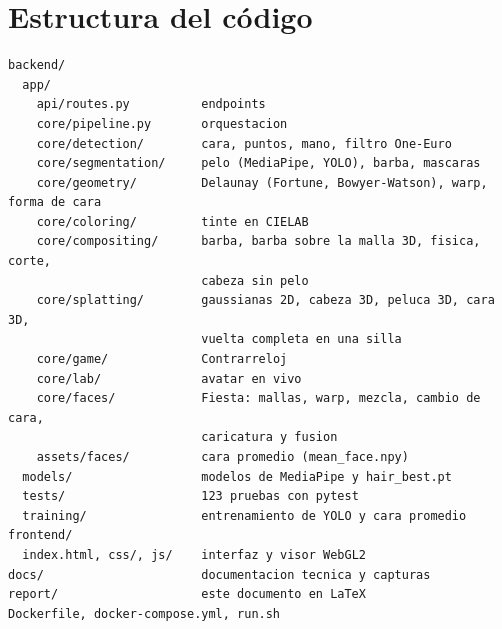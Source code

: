 \section{Estructura del código}

\begin{lstlisting}
backend/
  app/
    api/routes.py          endpoints
    core/pipeline.py       orquestacion
    core/detection/        cara, puntos, mano, filtro One-Euro
    core/segmentation/     pelo (MediaPipe, YOLO), barba, mascaras
    core/geometry/         Delaunay (Fortune, Bowyer-Watson), warp, forma de cara
    core/coloring/         tinte en CIELAB
    core/compositing/      barba, barba sobre la malla 3D, fisica, corte,
                           cabeza sin pelo
    core/splatting/        gaussianas 2D, cabeza 3D, peluca 3D, cara 3D,
                           vuelta completa en una silla
    core/game/             Contrarreloj
    core/lab/              avatar en vivo
    core/faces/            Fiesta: mallas, warp, mezcla, cambio de cara,
                           caricatura y fusion
    assets/faces/          cara promedio (mean_face.npy)
  models/                  modelos de MediaPipe y hair_best.pt
  tests/                   123 pruebas con pytest
  training/                entrenamiento de YOLO y cara promedio
frontend/
  index.html, css/, js/    interfaz y visor WebGL2
docs/                      documentacion tecnica y capturas
report/                    este documento en LaTeX
Dockerfile, docker-compose.yml, run.sh
\end{lstlisting}
